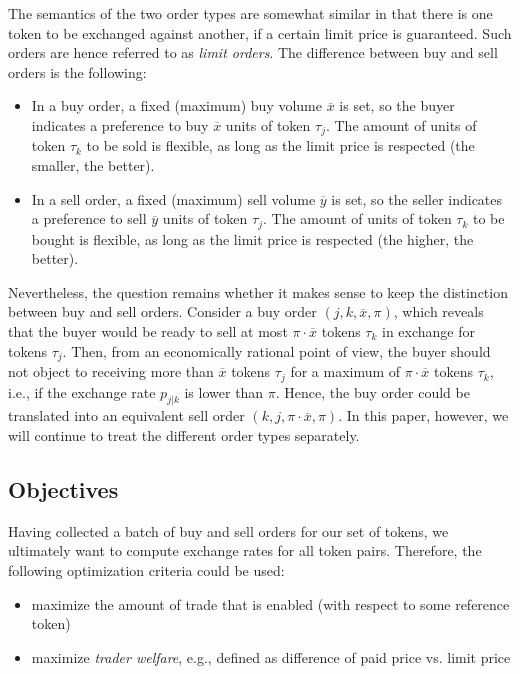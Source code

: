 \documentclass[11pt,parskip=full]{scrartcl}%
\newcommand*{\ie}{i.e., }
\newcommand*{\eg}{e.g., }
\newcommand*{\wrt}{with respect to }
\begin{document}
The semantics of the two order types are somewhat similar in that there is one token to be
exchanged against another, if a certain limit price is guaranteed.
Such orders are hence referred to as \emph{limit orders}.
The difference between buy and sell orders is the following:
\begin{itemize}
  \item In a buy order, a fixed (maximum) buy volume $ \overline{x} $ is set, so the buyer
  indicates a preference to buy $ \overline{x} $ units of token $ \tau_j $.
  The amount of units of token $ \tau_k $ to be sold is flexible, as long as the limit price is
  respected (the smaller, the better).
  \item In a sell order, a fixed (maximum) sell volume $ \overline{y} $ is set, so the seller
  indicates a preference to sell $ \overline{y} $ units of token $ \tau_j $.
  The amount of units of token $ \tau_k $ to be bought is flexible, as long as the limit price
  is respected (the higher, the better).
\end{itemize}
\vspace{.3cm}

Nevertheless, the question remains whether it makes sense to keep the distinction between buy and
sell orders.
Consider a buy order $ (j,k,\overline{x},\pi) $, which reveals that the buyer would be ready to
sell at most $ \pi \cdot \overline{x} $ tokens $ \tau_k $ in exchange for tokens $ \tau_j $.
Then, from an economically rational point of view, the buyer should not object to receiving more
than $ \overline{x} $ tokens $ \tau_j $ for a maximum of $ \pi \cdot \overline{x} $ tokens
$ \tau_k $, \ie if the exchange rate $ p_{j|k} $ is lower than $ \pi $.
Hence, the buy order could be translated into an equivalent sell order
$ (k,j,\pi \cdot \overline{x},\pi) $.
In this paper, however, we will continue to treat the different order types separately.


\subsection{Objectives}
\label{subsec:objectives}

Having collected a batch of buy and sell orders for our set of tokens, we ultimately want to
compute exchange rates for all token pairs.
Therefore, the following optimization criteria could be used:
\begin{itemize}
  \item maximize the amount of trade that is enabled (\wrt some reference token)
  \item maximize \emph{trader welfare}, \eg defined as difference of paid price vs. limit price
\end{itemize}
\end{document}
